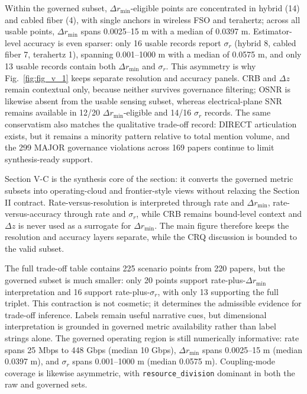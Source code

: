 \documentclass[letterpaper,journal]{IEEEtran}
\begin{document}
Within the governed subset, $\Delta r_{\min}$-eligible points are concentrated in hybrid (14) and cabled fiber (4), with single anchors in wireless FSO and terahertz; across all usable points, $\Delta r_{\min}$ spans 0.0025--15 m with a median of 0.0397 m. Estimator-level accuracy is even sparser: only 16 usable records report $\sigma_r$ (hybrid 8, cabled fiber 7, terahertz 1), spanning 0.001--1000 m with a median of 0.0575 m, and only 13 usable records contain both $\Delta r_{\min}$ and $\sigma_r$. This asymmetry is why Fig.~\ref{fig:fig_v_1} keeps separate resolution and accuracy panels. CRB and $\Delta z$ remain contextual only, because neither survives governance filtering; OSNR is likewise absent from the usable sensing subset, whereas electrical-plane SNR remains available in 12/20 $\Delta r_{\min}$-eligible and 14/16 $\sigma_r$ records. The same conservatism also matches the qualitative trade-off record: DIRECT articulation exists, but it remains a minority pattern relative to total mention volume, and the 299 MAJOR governance violations across 169 papers continue to limit synthesis-ready support.

Section V-C is the synthesis core of the section: it converts the governed metric subsets into operating-cloud and frontier-style views without relaxing the Section II contract. Rate-versus-resolution is interpreted through rate and $\Delta r_{\min}$, rate-versus-accuracy through rate and $\sigma_r$, while CRB remains bound-level context and $\Delta z$ is never used as a surrogate for $\Delta r_{\min}$. The main figure therefore keeps the resolution and accuracy layers separate, while the CRQ discussion is bounded to the valid subset.

The full trade-off table contains 225 scenario points from 220 papers, but the governed subset is much smaller: only 20 points support rate-plus-$\Delta r_{\min}$ interpretation and 16 support rate-plus-$\sigma_r$, with only 13 supporting the full triplet. This contraction is not cosmetic; it determines the admissible evidence for trade-off inference. Labels remain useful narrative cues, but dimensional interpretation is grounded in governed metric availability rather than label strings alone. The governed operating region is still numerically informative: rate spans 25 Mbps to 448 Gbps (median 10 Gbps), $\Delta r_{\min}$ spans 0.0025--15 m (median 0.0397 m), and $\sigma_r$ spans 0.001--1000 m (median 0.0575 m). Coupling-mode coverage is likewise asymmetric, with \texttt{resource\_division} dominant in both the raw and governed sets.
\end{document}
